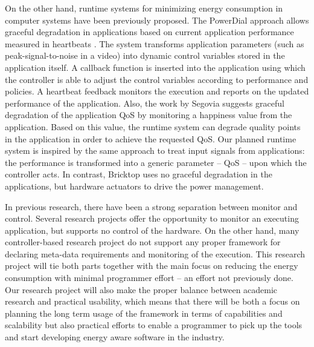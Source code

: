 \documentclass{article}
\begin{document}
On the other hand, runtime systems for minimizing energy consumption in computer systems have been previously proposed.
The PowerDial \cite{Hoffmann:11} approach allows graceful degradation in applications based on current application performance measured in heartbeats \cite{Hoffmann:10}. 
The system transforms application parameters (such as peak-signal-to-noise in a video) into dynamic control variables stored in the application itself. 
A callback function is inserted into the application using which the controller is able to adjust the control variables according to performance and policies.
A heartbeat feedback monitors the execution and reports on the updated performance of the application. 
Also, the work by Segovia \cite{Segovia:11} suggests graceful degradation of the application QoS by monitoring a happiness value from the application. 
Based on this value, the runtime system can degrade quality points in the application in order to achieve the requested QoS. 
Our planned runtime system is inspired by the same approach to treat input signals from applications: the performance is transformed into a generic parameter – QoS – upon which the controller acts.
In contrast, Bricktop uses no graceful degradation in the applications, but
hardware actuators to drive the power management.

In previous research, there have been a strong separation between monitor and control.
Several research projects offer the opportunity to monitor an executing application, but supports no control of the hardware.
On the other hand, many controller-based research project do not support any proper framework for declaring meta-data requirements and monitoring of the execution.
This research project will tie both parts together with the main focus on reducing the energy consumption with minimal programmer effort -- an effort not previously done.
Our research project will also make the proper balance between academic research and practical usability,
which means that there will be both a focus on planning the long term usage of the framework in terms of capabilities and scalability but also practical efforts to enable a programmer to pick up the tools and start developing energy aware software in the industry.
\end{document}

